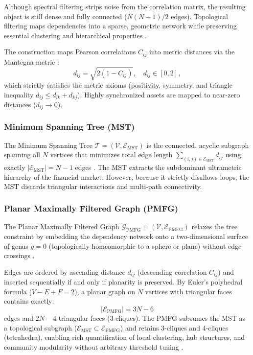 Although spectral filtering strips noise from the correlation matrix, the resulting object is still dense and fully connected ($N(N-1)/2$ edges). Topological filtering maps dependencies into a sparse, geometric network while preserving essential clustering and hierarchical properties \cite{tumminello_2010_correlation}.

The construction maps Pearson correlations $C_{ij}$ into metric distances via the Mantegna metric \cite{mantegna_1999_hierarchical}:
\begin{equation}
d_{ij} = \sqrt{2(1 - C_{ij})}, \quad d_{ij} \in [0, 2],
\label{eq:theory_mantegna_metric}
\end{equation}
which strictly satisfies the metric axioms (positivity, symmetry, and triangle inequality $d_{ij} \le d_{ik} + d_{kj}$). Highly synchronized assets are mapped to near-zero distances ($d_{ij} \to 0$).

\subsubsection{Minimum Spanning Tree (MST)}
The Minimum Spanning Tree $\mathcal{T} = (\mathcal{V}, \mathcal{E}_{\mathrm{MST}})$ is the connected, acyclic subgraph spanning all $N$ vertices that minimizes total edge length $\sum_{(i,j) \in \mathcal{E}_{\mathrm{MST}}} d_{ij}$ using exactly $|\mathcal{E}_{\mathrm{MST}}| = N - 1$ edges \cite{mantegna_1999_hierarchical,bonanno_2004_networks}. The MST extracts the subdominant ultrametric hierarchy of the financial market. However, because it strictly disallows loops, the MST discards triangular interactions and multi-path connectivity.

\subsubsection{Planar Maximally Filtered Graph (PMFG)}
The Planar Maximally Filtered Graph $\mathcal{G}_{\mathrm{PMFG}} = (\mathcal{V}, \mathcal{E}_{\mathrm{PMFG}})$ relaxes the tree constraint by embedding the dependency network onto a two-dimensional surface of genus $g=0$ (topologically homeomorphic to a sphere or plane) without edge crossings \cite{tumminello_2005_tool}.

Edges are ordered by ascending distance $d_{ij}$ (descending correlation $C_{ij}$) and inserted sequentially if and only if planarity is preserved. By Euler's polyhedral formula ($V - E + F = 2$), a planar graph on $N$ vertices with triangular faces contains exactly:
\begin{equation}
|\mathcal{E}_{\mathrm{PMFG}}| = 3N - 6
\label{eq:theory_pmfg_edges}
\end{equation}
edges and $2N - 4$ triangular faces (3-cliques). The PMFG subsumes the MST as a topological subgraph ($\mathcal{E}_{\mathrm{MST}} \subset \mathcal{E}_{\mathrm{PMFG}}$) and retains 3-cliques and 4-cliques (tetrahedra), enabling rich quantification of local clustering, hub structures, and community modularity without arbitrary threshold tuning \cite{aste_2010_correlation,pozzi_2013_spread}.

